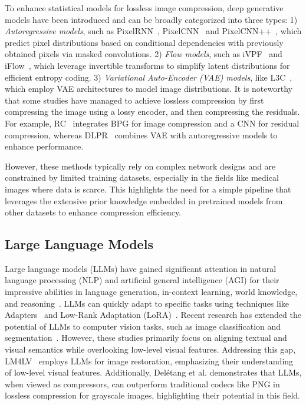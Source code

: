 To enhance statistical models for lossless image compression, deep generative models have been introduced and can be broadly categorized into three types: 
1) \textit{Autoregressive models}, such as PixelRNN~\cite{van2016pixel},  PixelCNN~\cite{van2016conditional} and PixelCNN++~\cite{Salimans2017PixeCNN}, which predict pixel distributions based on conditional dependencies with previously obtained pixels via masked convolutions. 
2) \textit{Flow models}, such as iVPF~\cite{zhang2021ivpf} and iFlow~\cite{zhang2021iflow}, which leverage invertible transforms to simplify latent distributions for efficient entropy coding. 
3) \textit{Variational Auto-Encoder (VAE) models}, like L3C~\cite{mentzer2019practical}, which employ VAE architectures to model image distributions. It is noteworthy that some studies have managed to achieve lossless compression by first compressing the image using a lossy encoder, and then compressing the residuals. For example, RC~\cite{mentzer2020learning} integrates BPG for image compression and a CNN for residual compression, whereas DLPR~\cite{bai2024deep} combines VAE with autoregressive models to enhance performance.

However, these methods typically rely on complex network designs and are constrained by limited training datasets, especially in the fields like medical images where data is scarce. This highlights the need for a simple pipeline that leverages the extensive prior knowledge embedded in pretrained models from other datasets to enhance compression efficiency.

\subsection{Large Language Models}
Large language models (LLMs) have gained significant attention in natural language processing (NLP) and artificial general intelligence (AGI) for their impressive abilities in language generation, in-context learning, world knowledge, and reasoning~\cite{Wang_2023_NIPS_VisionLLM}.
LLMs can quickly adapt to specific tasks using techniques like Adapters~\cite{houlsby2019parameter} and Low-Rank Adaptation (LoRA)~\cite{hu2021lora}. Recent research has extended the potential of LLMs to computer vision tasks, such as image classification and segmentation~\cite{Gou_2024_arxiv_llmcimageclassification,yang2023improved}. However, these studies primarily focus on aligning textual and visual semantics while overlooking low-level visual features. Addressing this gap, LM4LV~\cite{zheng2024lm4lv} employs LLMs for image restoration, emphasizing their understanding of low-level visual features. Additionally, Del{\'e}tang et al.\cite{deletang2023language} demonstrates that LLMs, when viewed as compressors, can outperform traditional codecs like PNG in lossless compression for grayscale images, highlighting their potential in this field.